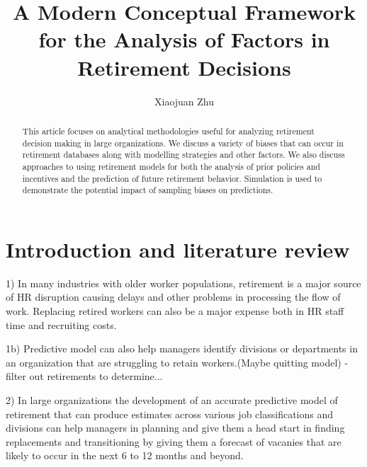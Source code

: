 \documentclass[12pt,letterpaper]{article}
\title{A Modern Conceptual Framework for the Analysis of Factors in Retirement Decisions}
\author{Xiaojuan Zhu}
\begin{document}
\maketitle

\begin{abstract}
This article focuses on analytical methodologies useful for analyzing retirement decision making in large organizations.  We discuss a variety of biases that can occur in retirement databases along with modelling strategies and other factors.  We also discuss approaches to using retirement models for both the analysis of prior policies and incentives and the prediction of future retirement behavior.  Simulation is used to demonstrate the potential impact of sampling biases on predictions.
\end{abstract}



\section{Introduction and literature review}

1) In many industries with older worker populations, retirement is a major source of HR disruption causing delays and other problems in processing the flow of work.  Replacing retired workers can also be a major expense both in HR staff time and recruiting costs.

1b) Predictive model can also help managers identify divisions or departments in an organization that are struggling to retain workers.(Maybe quitting model) - filter out retirements to determine...

2) In large organizations the development of an accurate predictive model of retirement that can produce estimates across various job classifications and divisions can help managers in planning and give them a head start in finding replacements and transitioning by giving them a forecast of vacanies that are likely to occur in the next 6 to 12 months and beyond.
\end{document}
